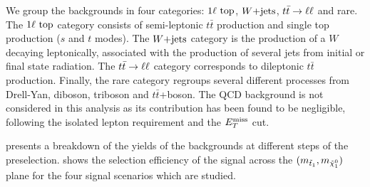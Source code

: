         We group the backgrounds in four categories: $1\ell~\text{top}$, $\text{$W$+jets}$, $t\bar{t} \rightarrow \ell \ell$
        and rare. The $1\ell~\text{top}$ category consists of semi-leptonic $t\bar{t}$
        production and single top production ($s$ and $t$ modes). The $\text{$W$+jets}$
        category is the production of a $W$ decaying leptonically, associated with the
        production of several jets from initial or final state radiation. The $t\bar{t} \rightarrow \ell \ell$
        category corresponds to dileptonic $t\bar{t}$ production. Finally, the rare
        category regroups several different processes from Drell-Yan, diboson, triboson and
        $t\bar{t}$+boson. The QCD background is not considered in this analysis as its
        contribution has been found to be negligible, following the isolated lepton
        requirement and the $E_T^\text{miss}$ cut.

         presents a breakdown of the yields of the backgrounds
        at different steps of the preselection.  shows
        the selection efficiency of the signal across the $(m_{\tilde{t}_1}, m_{\tilde{\chi}_1^0})$
        plane for the four signal scenarios which are studied.

